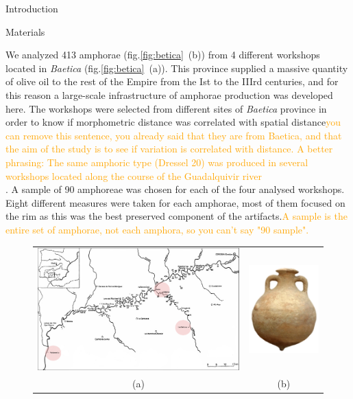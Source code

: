 \documentclass[final]{beamer}
\newcommand{\memo}[2]{\textcolor{#1}{#2}}
\newcommand{\xavi}[1]{\memo{orange}{#1\\}}
\newlength{\onecolwid}
\begin{document}
\begin{frame}[t]
\begin{columns}[t]
\begin{column}{\onecolwid}
\begin{block}{Introduction}
\end{block}


\begin{block}{Materials}

\justify
We analyzed 413 amphorae (fig.\ref{fig:betica}~(b)) from 4 different workshops located in \emph{Baetica} (fig.\ref{fig:betica}~(a)). This province supplied a massive quantity of olive oil to the rest of the Empire from the Ist to the IIIrd centuries, and for this reason a large-scale infrastructure of amphorae production was developed here. The workshops were selected from different sites of \emph{Baetica} province in order to know if morphometric distance was correlated with spatial distance\xavi{you can remove this sentence, you already said that they are from Baetica, and that the aim of the study is to see if variation is correlated with distance. A better phrasing: The same amphoric type (Dressel 20) was produced in several workshops located along the course of the Guadalquivir river}. A sample of 90 amphoreae was chosen for each of the four analysed workshops. Eight different measures were taken for each amphorae, most of them focused on the rim as this was the best preserved component of the artifacts.\xavi{A sample is the entire set of amphorae, not each amphora, so you can't say "90 sample".}
\begin{figure}
\begin{tabular}{cc}


\includegraphics[width=0.7\linewidth]{images/fig1.png} &
\includegraphics[width=0.2\linewidth]{images/amphorae.png} \\
(a) & (b)
\end{tabular}


\end{figure}
\end{block}
\end{column}
\end{columns}
\end{frame}
\end{document}

